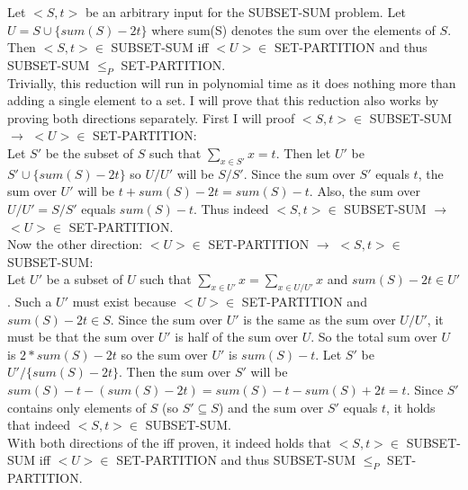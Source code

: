 \documentclass{article}
\begin{document}
Let $<S,t>$ be an arbitrary input for the SUBSET-SUM problem.
Let $U = S \cup \{sum(S) - 2t\}$ where sum(S) denotes the sum over the elements of $S$.
Then $<S,t> \in$ SUBSET-SUM iff $<U> \in$ SET-PARTITION and thus SUBSET-SUM $\leq_P$ SET-PARTITION.\\
Trivially, this reduction will run in polynomial time as it does nothing more than adding a single element to a set.
I will prove that this reduction also works by proving both directions separately. 
First I will proof $<S,t> \in$ SUBSET-SUM $\rightarrow$ $<U> \in$ SET-PARTITION:\\
Let $S'$ be the subset of $S$ such that $\sum_{x \in S'}x = t$. 
Then let $U'$ be $S' \cup \{sum(S) - 2t\}$ so $U / U'$ will be $S / S'$.
Since the sum over $S'$ equals $t$, the sum over $U'$ will be $t + sum(S) - 2t = sum(S) - t$.
Also, the sum over $U / U' = S / S'$ equals $sum(S) - t$. Thus indeed $<S,t> \in$ SUBSET-SUM $\rightarrow$ $<U> \in$ SET-PARTITION.\\
Now the other direction: $<U> \in$ SET-PARTITION $\rightarrow$ $<S,t> \in$ SUBSET-SUM:\\
Let $U'$ be a subset of $U$ such that $\sum_{x \in U'}x = \sum_{x \in U / U'}x$ and $sum(S) - 2t \in U'$.
Such a $U'$ must exist because $<U> \in$ SET-PARTITION and $sum(S) - 2t \in S$.
Since the sum over $U'$ is the same as the sum over $U / U'$, it must be that the sum over $U'$ is half of the sum over $U$.
So the total sum over $U$ is $2*sum(S) - 2t$ so the sum over $U'$ is $sum(S) - t$.
Let $S'$ be $U' / \{sum(S) - 2t\}$. Then the sum over $S'$ will be $sum(S) - t - (sum(S) - 2t) = sum(S) - t - sum(S) + 2t = t$.
Since $S'$ contains only elements of $S$ (so $S' \subseteq S$) and the sum over $S'$ equals $t$, it holds that indeed $<S,t> \in$ SUBSET-SUM.\\
With both directions of the iff proven, it indeed holds that $<S,t> \in$ SUBSET-SUM iff $<U> \in$ SET-PARTITION and thus SUBSET-SUM $\leq_P$ SET-PARTITION.
\end{document}
